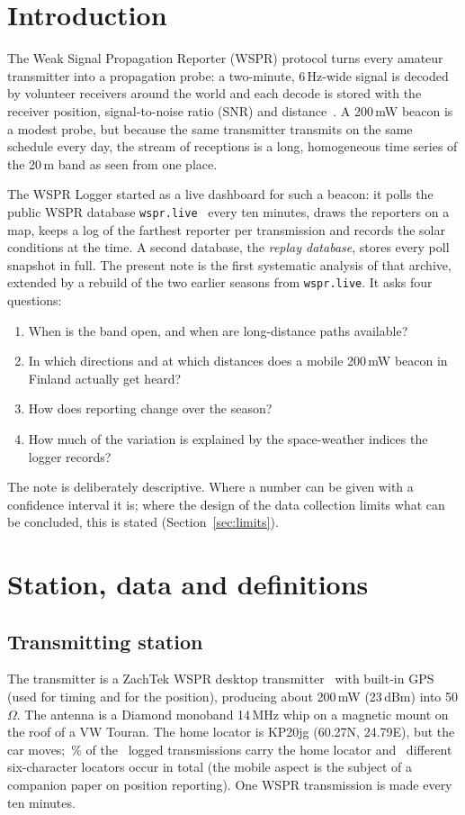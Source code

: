 \documentclass[10pt,a4paper]{article}
\begin{document}
\section{Introduction}
The Weak Signal Propagation Reporter (WSPR) protocol turns every amateur transmitter into a propagation probe: a two-minute, 6\,Hz-wide signal is decoded by volunteer receivers around the world and each decode is stored with the receiver position, signal-to-noise ratio (SNR) and distance~\cite{wsprnet,wsjtx}. A 200\,mW beacon is a modest probe, but because the same transmitter transmits on the same schedule every day, the stream of receptions is a long, homogeneous time series of the 20\,m band as seen from one place.

The WSPR Logger started as a live dashboard for such a beacon: it polls the public WSPR database \texttt{wspr.live}~\cite{wsprlive} every ten minutes, draws the reporters on a map, keeps a log of the farthest reporter per transmission and records the solar conditions at the time. A second database, the \emph{replay database}, stores every poll snapshot in full. The present note is the first systematic analysis of that archive, extended by a rebuild of the two earlier seasons from \texttt{wspr.live}. It asks four questions:
\begin{enumerate}[label=(\alph*)]
\item When is the band open, and when are long-distance paths available?
\item In which directions and at which distances does a mobile 200\,mW beacon in Finland actually get heard?
\item How does reporting change over the season?
\item How much of the variation is explained by the space-weather indices the logger records?
\end{enumerate}
The note is deliberately descriptive. Where a number can be given with a confidence interval it is; where the design of the data collection limits what can be concluded, this is stated (Section~\ref{sec:limits}).

\section{Station, data and definitions}
\subsection{Transmitting station}
The transmitter is a ZachTek WSPR desktop transmitter~\cite{zachtek} with built-in GPS (used for timing and for the position), producing about 200\,mW (23\,dBm) into 50\,$\Omega$. The antenna is a Diamond monoband 14\,MHz whip on a magnetic mount on the roof of a VW Touran. The home locator is KP20jg (60.27\textdegree N, 24.79\textdegree E), but the car moves; \homeShare\,\% of the \nSpots\ logged transmissions carry the home locator and \nTxLoc\ different six-character locators occur in total (the mobile aspect is the subject of a companion paper on position reporting). One WSPR transmission is made every ten minutes.
\end{document}
